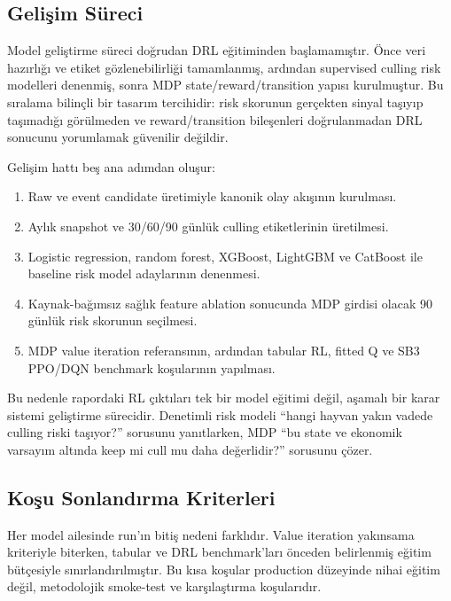 \documentclass[conference]{IEEEtran}
\begin{document}
\subsection{Gelişim Süreci}
Model geliştirme süreci doğrudan DRL eğitiminden başlamamıştır. Önce veri
hazırlığı ve etiket gözlenebilirliği tamamlanmış, ardından supervised culling
risk modelleri denenmiş, sonra MDP state/reward/transition yapısı kurulmuştur.
Bu sıralama bilinçli bir tasarım tercihidir: risk skorunun gerçekten sinyal
taşıyıp taşımadığı görülmeden ve reward/transition bileşenleri doğrulanmadan
DRL sonucunu yorumlamak güvenilir değildir.

Gelişim hattı beş ana adımdan oluşur:
\begin{enumerate}
    \item Raw ve event candidate üretimiyle kanonik olay akışının kurulması.
    \item Aylık snapshot ve 30/60/90 günlük culling etiketlerinin üretilmesi.
    \item Logistic regression, random forest, XGBoost, LightGBM ve CatBoost ile
    baseline risk model adaylarının denenmesi.
    \item Kaynak-bağımsız sağlık feature ablation sonucunda MDP girdisi olacak
    90 günlük risk skorunun seçilmesi.
    \item MDP value iteration referansının, ardından tabular RL, fitted Q ve
    SB3 PPO/DQN benchmark koşularının yapılması.
\end{enumerate}

Bu nedenle rapordaki RL çıktıları tek bir model eğitimi değil, aşamalı bir
karar sistemi geliştirme sürecidir. Denetimli risk modeli ``hangi hayvan yakın
vadede culling riski taşıyor?'' sorusunu yanıtlarken, MDP ``bu state ve ekonomik
varsayım altında keep mi cull mu daha değerlidir?'' sorusunu çözer.

\subsection{Koşu Sonlandırma Kriterleri}
Her model ailesinde run'ın bitiş nedeni farklıdır. Value iteration yakınsama
kriteriyle biterken, tabular ve DRL benchmark'ları önceden belirlenmiş eğitim
bütçesiyle sınırlandırılmıştır. Bu kısa koşular production düzeyinde nihai
eğitim değil, metodolojik smoke-test ve karşılaştırma koşularıdır.
\end{document}
